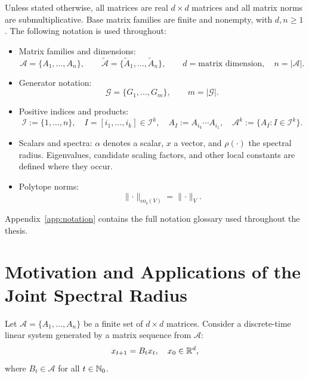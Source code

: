 Unless stated otherwise, all matrices are real $d \times d$ matrices and all matrix norms are submultiplicative.
Base matrix families are finite and nonempty, with $d,n\geq1$.
The following notation is used throughout:
\begin{itemize}
    \item Matrix families and dimensions:
    \[
        \mathcal{A}=\{A_1,\dots,A_n\},\qquad
        \tilde{\mathcal{A}}=\{\tilde{A}_1,\dots,\tilde{A}_n\},\qquad
        d=\text{matrix dimension},\quad n=|\mathcal{A}|.
    \]
    \item Generator notation:
    \[
        \mathcal{G}=\{G_1,\dots,G_m\},\qquad m=|\mathcal{G}|.
    \]
    \item Positive indices and products:
    \[
        \mathcal{I}:=\{1,\dots,n\},\quad
        I=[i_1,\dots,i_k]\in\mathcal{I}^k,\quad
        A_I:=A_{i_k}\cdots A_{i_1},\quad
        \mathcal{A}^k:=\{A_I:I\in\mathcal{I}^k\}.
    \]
    \item Scalars and spectra: $\alpha$ denotes a scalar, $x$ a vector, and $\rho(\cdot)$ the spectral radius.
    Eigenvalues, candidate scaling factors, and other local constants are defined where they occur.
    \item Polytope norms:
    \[
        \lVert \cdot\rVert _{\mathrm{co}_{\mathrm{s}}(V)}=\lVert \cdot\rVert _V.
    \]
\end{itemize}

Appendix~\ref{app:notation} contains the full notation glossary used throughout the thesis.

\section{Motivation and Applications of the Joint Spectral Radius}
\label{sec:introMotivationJSR}

Let $\mathcal{A} = \{A_1,\dots, A_n\}$ be a finite set of $d\times d$ matrices.
Consider a discrete-time linear system generated by a matrix sequence from $\mathcal{A}$:
\begin{equation} \label{eq:switched_system}
    x_{t+1} = B_t x_t, \quad x_0 \in \mathbb{R}^d,
\end{equation}
where $B_t \in \mathcal{A}$ for all $t \in \mathbb{N}_0$.


